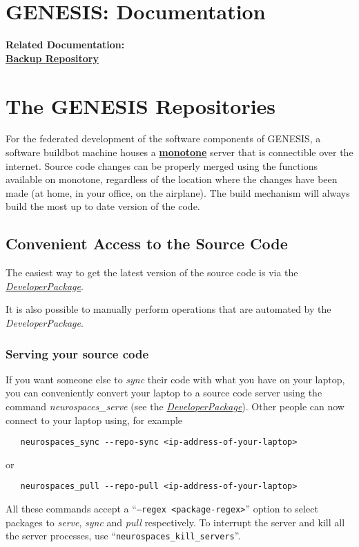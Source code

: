 \documentclass[12pt]{article}
\begin{document}
\section*{GENESIS: Documentation}

{\bf Related Documentation:}\\
\href{../backup-repository/backup-repository.tex}{\bf Backup Repository}

\section*{The GENESIS Repositories}

For the federated development of the software components of GENESIS, a software buildbot machine houses a \href{http://monotone.ca/}{\bf monotone} server that is connectible over the internet. Source code changes can be properly merged using the functions available on monotone, regardless of the location where the changes have been made (at home, in your office, on the airplane). The build mechanism will always build the most up to date version of the code.

\subsection*{Convenient Access to the Source Code}

The easiest way to get the latest version of the source code is via the \href{../developer-package/developer-package.tex}{\it DeveloperPackage}.

It is also possible to manually perform operations that are automated by the {\it DeveloperPackage}.

\subsubsection*{Serving your source code}

If you want someone else to {\it sync} their code with what you have on your laptop, you can conveniently convert your laptop to a source code server using the command {\it neurospaces\_serve} (see the \href{../developer-package/developer-package.tex}{\it DeveloperPackage}). Other people can now connect to your laptop using, for example
\begin{verbatim}
   neurospaces_sync --repo-sync <ip-address-of-your-laptop>
\end{verbatim}
or
\begin {verbatim}
   neurospaces_pull --repo-pull <ip-address-of-your-laptop>
\end{verbatim}
All these commands accept a ``{\tt --regex <package-regex>}'' option to select packages to {\it serve}, {\it sync} and {\it pull} respectively. To interrupt the server and kill all the server processes, use ``{\tt neurospaces\_kill\_servers}''.
\end{document}
